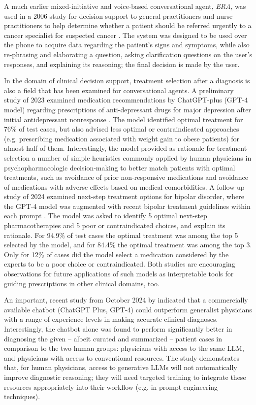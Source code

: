 A much earlier mixed-initiative and voice-based conversational agent, \textit{ERA}, was used in a 2006 study for decision support to general practitioners and nurse practitioners to help determine whether a patient should be referred urgently to a cancer specialist for suspected cancer \cite{decisioncancer2006}. The system was designed to be used over the phone to acquire data regarding the patient’s signs and symptoms, while also re-phrasing and elaborating a question, asking clarification questions on the user's responses, and explaining its reasoning; the final decision is made by the user.

In the domain of clinical decision support, treatment selection after a diagnosis is also a field that has been examined for conversational agents. A preliminary study of 2023 examined medication recommendations by ChatGPT-plus (GPT-4 model) regarding prescriptions of anti-depressant drugs for major depression after initial antidepressant nonresponse \cite{Perlis2023}. The model identified optimal treatment for 76\% of test cases, but also advised less optimal or contraindicated approaches (e.g. prescribing medication associated with weight gain to obese patients) for almost half of them. Interestingly, the model provided as rationale for treatment selection a number of simple heuristics commonly applied by human physicians in psychopharmacologic decision-making to better match patients with optimal treatments, such as avoidance of prior non-responsive medications and avoidance of medications with adverse effects based on medical comorbidities. A follow-up study of 2024 examined next-step treatment options for bipolar disorder, where the GPT-4 model was augmented with recent bipolar treatment guidelines within each prompt \cite{perlisetal2024}. The model was asked to identify 5 optimal next-step pharmacotherapies and 5 poor or contraindicated choices, and explain its rationale. For 94.9\% of test cases the optimal treatment was among the top 5 selected by the model, and for 84.4\% the optimal treatment was among the top 3. Only for 12\% of cases did the model select a medication considered by the experts to be a poor choice or contraindicated. Both studies are encouraging observations for future applications of such models as interpretable tools for guiding prescriptions in other clinical domains, too.

An important, recent study from October 2024 by \citeauthor{DiagnosticReasoningLLM2024} indicated that a commercially available chatbot (ChatGPT Plus, GPT-4) could outperform generalist physicians with a range of experience levels in making accurate clinical diagnoses. Interestingly, the chatbot alone was found to perform significantly better in diagnosing the given -- albeit curated and summarized -- patient cases in comparison to the two human groups: physicians with access to the same LLM, and physicians with access to conventional resources. The study demonstrates that, for human physicians, access to generative LLMs will not automatically improve diagnostic reasoning; they will need targeted training to integrate these resources appropriately into their workflow (e.g. in prompt engineering techniques).

